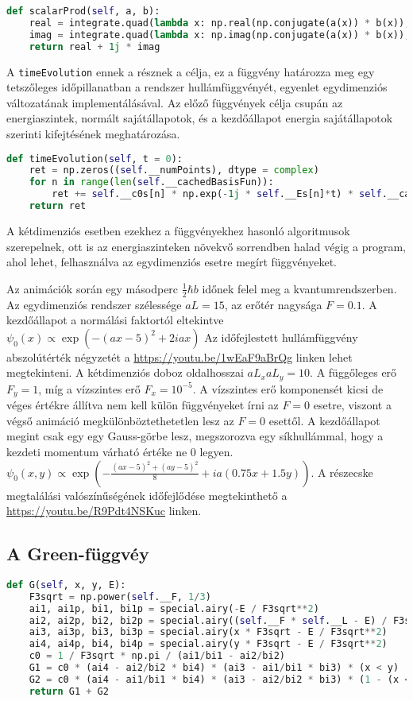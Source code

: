\begin{lstlisting}[language=Python]
def scalarProd(self, a, b):
    real = integrate.quad(lambda x: np.real(np.conjugate(a(x)) * b(x)), 0, self.__L)[0]
    imag = integrate.quad(lambda x: np.imag(np.conjugate(a(x)) * b(x)), 0, self.__L)[0]
    return real + 1j * imag
\end{lstlisting}
A \texttt{timeEvolution} ennek a résznek a célja, ez a függvény határozza meg egy tetszőleges időpillanatban a rendszer hullámfüggvényét,  egyenlet egydimenziós változatának implementálásával. Az előző függvények célja csupán az energiaszintek, normált sajátállapotok, és a kezdőállapot energia sajátállapotok szerinti kifejtésének meghatározása.
\begin{lstlisting}[language=Python]
def timeEvolution(self, t = 0):
    ret = np.zeros((self.__numPoints), dtype = complex)
    for n in range(len(self.__cachedBasisFun)):
        ret += self.__c0s[n] * np.exp(-1j * self.__Es[n]*t) * self.__cachedBasisFun[n, :]
    return ret
\end{lstlisting}
A kétdimenziós esetben ezekhez a függvényekhez hasonló algoritmusok szerepelnek, ott is az energiaszinteken növekvő sorrendben halad végig a program, ahol lehet, felhasználva az egydimenziós esetre megírt függvényeket.

Az animációk során egy másodperc $\frac{1}{2}\hbar b$ időnek felel meg a kvantumrendszerben. Az egydimenziós rendszer szélessége $aL=15$, az erőtér nagysága $F=0.1$. A kezdőállapot a normálási faktortól eltekintve $\psi_0(x)\propto \exp\left(-(ax-5)^2+2iax\right)$ Az időfejlestett hullámfüggvény abszolútérték négyzetét a \url{https://youtu.be/1wEaF9aBrQg} linken lehet megtekinteni. A kétdimenziós doboz oldalhosszai $aL_xaL_y=10$. A függőleges erő $F_y=1$, míg a vízszintes erő $F_x=10^{-5}$. A vízszintes erő komponensét kicsi de véges értékre állítva nem kell külön függvényeket írni az $F=0$ esetre, viszont a végső animáció megkülönböztethetetlen lesz az $F=0$ esettől. A kezdőállapot megint csak egy egy Gauss-görbe lesz, megszorozva egy síkhullámmal, hogy a kezdeti momentum várható értéke ne $0$ legyen. $\psi_0(x,y)\propto\exp\left(-\frac{(ax-5)^2+(ay-5)^2}{8}+ia(0.75x+1.5y)\right)$. A részecske megtalálási valószínűségének időfejlődése megtekinthető a \url{https://youtu.be/R9Pdt4NSKuc} linken.
\subsection{A Green-függvéy}
\begin{lstlisting}[language=Python]
def G(self, x, y, E):
    F3sqrt = np.power(self.__F, 1/3)
    ai1, ai1p, bi1, bi1p = special.airy(-E / F3sqrt**2)
    ai2, ai2p, bi2, bi2p = special.airy((self.__F * self.__L - E) / F3sqrt**2)
    ai3, ai3p, bi3, bi3p = special.airy(x * F3sqrt - E / F3sqrt**2)
    ai4, ai4p, bi4, bi4p = special.airy(y * F3sqrt - E / F3sqrt**2)
    c0 = 1 / F3sqrt * np.pi / (ai1/bi1 - ai2/bi2)
    G1 = c0 * (ai4 - ai2/bi2 * bi4) * (ai3 - ai1/bi1 * bi3) * (x < y)
    G2 = c0 * (ai4 - ai1/bi1 * bi4) * (ai3 - ai2/bi2 * bi3) * (1 - (x < y))
    return G1 + G2
\end{lstlisting}

